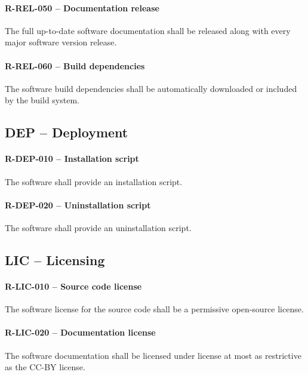 \paragraph{R-REL-050 -- Documentation release}
The full up-to-date software documentation shall be released along with
every major software version release.

\paragraph{R-REL-060 -- Build dependencies}
The software build dependencies shall be automatically downloaded or included by
the build system.

\subsection{DEP -- Deployment}
\paragraph{R-DEP-010 -- Installation script}
The software shall provide an installation script.

\paragraph{R-DEP-020 -- Uninstallation script}
The software shall provide an uninstallation script.

\subsection{LIC -- Licensing}
\paragraph{R-LIC-010 -- Source code license}
The software license for the source code shall be a permissive open-source
license.

\paragraph{R-LIC-020 -- Documentation license}
The software documentation shall be licensed under license at most as
restrictive as the CC-BY license.
